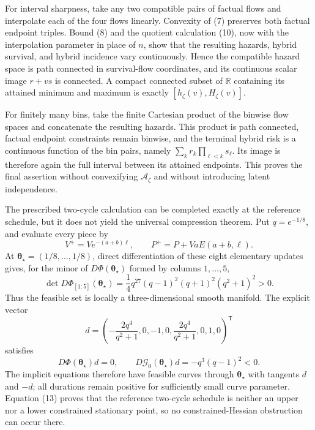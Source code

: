 For interval sharpness, take any two compatible pairs of factual flows and interpolate each of the four flows linearly.  Convexity of (7) preserves both factual endpoint triples.  Bound (8) and the quotient calculation (10), now with the interpolation parameter in place of \(n\), show that the resulting hazards, hybrid survival, and hybrid incidence vary continuously.  Hence the compatible hazard space is path connected in survival-flow coordinates, and its continuous scalar image \(r+vs\) is connected.  A compact connected subset of \(\mathbb R\) containing its attained minimum and maximum is exactly \([h_\zeta(v),H_\zeta(v)]\).

For finitely many bins, take the finite Cartesian product of the binwise flow spaces and concatenate the resulting hazards.  This product is path connected, factual endpoint constraints remain binwise, and the terminal hybrid risk is a continuous function of the bin pairs, namely \(\sum_k r_k\prod_{\ell<k}s_\ell\).  Its image is therefore again the full interval between its attained endpoints.  This proves the final assertion without convexifying \(\mathcal A_\zeta\) and without introducing latent independence.

The prescribed two-cycle calculation can be completed exactly at the reference schedule, but it does not yield the universal compression theorem.  Put \(q=e^{-1/8}\), and evaluate every piece by
\[
 V^+=Ve^{-(a+b)\ell},\quad\quad P^+=P+VaE(a+b,\ell).
\]
At \(\boldsymbol\theta_\star=(1/8,\ldots,1/8)\), direct differentiation of these eight elementary updates gives, for the minor of \(D\Phi(\boldsymbol\theta_\star)\) formed by columns \(1,\ldots,5\),
\[
 \det D\Phi_{[1:5]}(\boldsymbol\theta_\star)
 =\frac14q^{27}(q-1)^2(q+1)^2(q^2+1)^2>0.               \tag{12}
\]
Thus the feasible set is locally a three-dimensional smooth manifold.  The explicit vector
\[
 d=\left(-\frac{2q^4}{q^2+1},0,-1,0,
          \frac{2q^4}{q^2+1},0,1,0\right)^{\mathsf T}
\]
satisfies
\[
 D\Phi(\boldsymbol\theta_\star)d=0,
 \quad\quad
 D\mathcal G_0(\boldsymbol\theta_\star)d
 =-q^3(q-1)^2<0.                                         \tag{13}
\]
The implicit equations therefore have feasible curves through \(\boldsymbol\theta_\star\) with tangents \(d\) and \(-d\); all durations remain positive for sufficiently small curve parameter.  Equation (13) proves that the reference two-cycle schedule is neither an upper nor a lower constrained stationary point, so no constrained-Hessian obstruction can occur there.

